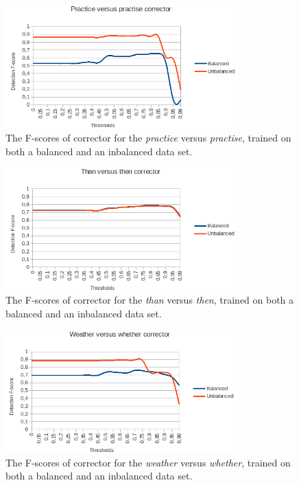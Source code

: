 \documentclass[12pt]{article}
\begin{document}
\begin{figure}[H]
\centering
\includegraphics[width=0.8\textwidth]{fscore_practicepractise.png}
\caption{The F-scores of corrector for the \emph{practice} versus \emph{practise}, trained on both a balanced and an inbalanced data set.}
\end{figure}

\begin{figure}[H]
\centering
\includegraphics[width=0.8\textwidth]{fscore_thanthen.png}
\caption{The F-scores of corrector for the \emph{than} versus \emph{then}, trained on both a balanced and an inbalanced data set.}
\end{figure}

\begin{figure}[H]
\centering
\includegraphics[width=0.8\textwidth]{fscore_weatherwhether.png}
\caption{The F-scores of corrector for the \emph{weather} versus \emph{whether}, trained on both a balanced and an inbalanced data set.}
\end{figure}
\end{document}

